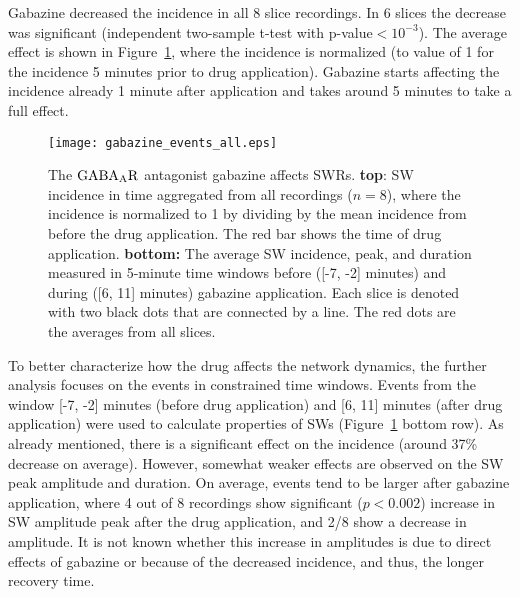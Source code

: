     Gabazine decreased the incidence in all 8 slice recordings. In 6 slices the
    decrease was significant (independent two-sample t-test with
    p-value$<10^{-3}$). The average effect is shown in
    Figure~\ref{fig:gabazine_sum}, where the incidence is normalized (to value
    of 1 for the incidence 5 minutes prior to drug application). Gabazine
    starts affecting the incidence already 1 minute after application and takes
    around 5 minutes to take a full effect. 
    
    \begin{figure}
      \center
      \texttt{[image: gabazine\_events\_all.eps]}
      \caption{
        The $\rm GABA_AR$ antagonist gabazine affects SWRs. {\bf top}: SW
        incidence in time aggregated from all recordings ($n=8$), where the
        incidence is normalized to 1 by dividing by the mean incidence from
        before the drug application. The red bar shows the time of drug
        application.  {\bf bottom:} The average SW incidence, peak, and
        duration measured in 5-minute time windows before ([-7, -2] minutes)
        and during ([6, 11] minutes) gabazine application. Each slice is
        denoted with two black dots that are connected by a line. The red dots
        are the averages from all slices.
      }
      \label{fig:gabazine_sum}
    \end{figure}

    To better characterize how the drug affects the network dynamics, the
    further analysis focuses on the events in constrained time windows. Events
    from the window [-7, -2] minutes (before drug application) and [6, 11]
    minutes (after drug application) were used to calculate properties of SWs
    (Figure~\ref{fig:gabazine_sum} bottom row). As already mentioned, there is
    a significant effect on the incidence (around 37\% decrease on average).
    However, somewhat weaker effects are observed on the SW peak amplitude and
    duration. On average, events tend to be larger after gabazine application,
    where 4 out of 8 recordings show significant ($p<0.002$) increase in SW
    amplitude peak after the drug application, and 2/8 show a decrease in
    amplitude. It is not known whether this increase in amplitudes is due to
    direct effects of gabazine or because of the decreased incidence, and thus,
    the longer recovery time. 

